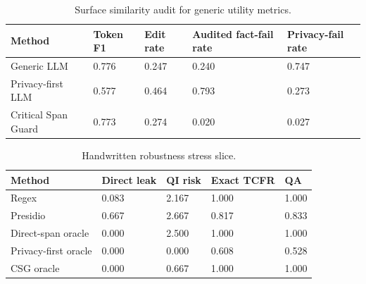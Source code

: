 \begin{table}[t]
\centering
\begin{tabular}{lllll}
\toprule
Method & Token F1 & Edit rate & Audited fact-fail rate & Privacy-fail rate \\
\midrule
Generic LLM & 0.776 & 0.247 & 0.240 & 0.747 \\
Privacy-first LLM & 0.577 & 0.464 & 0.793 & 0.273 \\
Critical Span Guard & 0.773 & 0.274 & 0.020 & 0.027 \\
\bottomrule
\end{tabular}
\caption{Surface similarity audit for generic utility metrics.}
\end{table}

\begin{table}[t]
\centering
\begin{tabular}{lllll}
\toprule
Method & Direct leak & QI risk & Exact TCFR & QA \\
\midrule
Regex & 0.083 & 2.167 & 1.000 & 1.000 \\
Presidio & 0.667 & 2.667 & 0.817 & 0.833 \\
Direct-span oracle & 0.000 & 2.500 & 1.000 & 1.000 \\
Privacy-first oracle & 0.000 & 0.000 & 0.608 & 0.528 \\
CSG oracle & 0.000 & 0.667 & 1.000 & 1.000 \\
\bottomrule
\end{tabular}
\caption{Handwritten robustness stress slice.}
\end{table}
